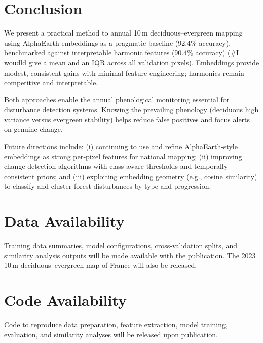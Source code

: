 \documentclass[utf8]{FrontiersinHarvard}
\begin{document}
\section{Conclusion}

We present a practical method to annual 10\,m deciduous–evergreen mapping using AlphaEarth embeddings as a pragmatic baseline (92.4\% accuracy), benchmarked against interpretable harmonic features (90.4\% accuracy) (#I woudld give a mean and an IQR across all validation pixels). Embeddings provide modest, consistent gains with minimal feature engineering; harmonics remain competitive and interpretable.

Both approaches enable the annual phenological monitoring essential for disturbance detection systems. Knowing the prevailing phenology (deciduous high variance versus evergreen stability) helps reduce false positives and focus alerts on genuine change.

Future directions include: (i) continuing to use and refine AlphaEarth‑style embeddings as strong per‑pixel features for national mapping; (ii) improving change‑detection algorithms with class‑aware thresholds and temporally consistent priors; and (iii) exploiting embedding geometry (e.g., cosine similarity) to classify and cluster forest disturbances by type and progression.

\section*{Data Availability}
Training data summaries, model configurations, cross-validation splits, and similarity analysis outputs will be made available with the publication. The 2023 10\,m deciduous–evergreen map of France will also be released.

\section*{Code Availability}
Code to reproduce data preparation, feature extraction, model training, evaluation, and similarity analyses will be released upon publication.



\end{document}
